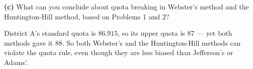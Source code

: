 \documentclass[12pt]{ximera}
\begin{document}
\begin{problem}
\begin{prompt}
\textbf{(c)} What can you conclude about quota breaking in Webster's method and the
Huntington-Hill method, based on Problems 1 and 2?

\begin{multipleChoice}
\end{multipleChoice}

\begin{feedback}
District A's standard quota is $86.915$, so its upper quota is $87$ --- yet both methods
gave it $88$. So both Webster's and the Huntington-Hill methods can violate the quota
rule, even though they are less biased than Jefferson's or Adams'.
\end{feedback}
\end{prompt}
\end{problem}
\end{document}
